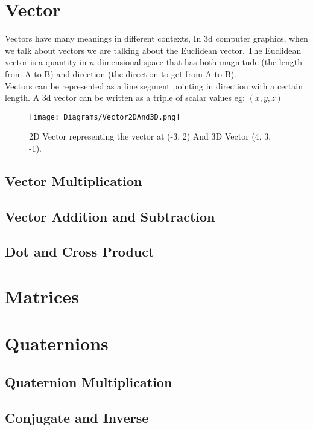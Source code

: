 \section{Vector}

Vectors have many meanings in different contexts, In \acrshort{3d} computer graphics, when we talk about vectors we are talking about the Euclidean vector. The Euclidean vector is a quantity in $n$-dimensional space that has both magnitude (the length from A to B) and direction (the direction to get from A to B). \\
Vectors can be represented as a line segment pointing in direction with a certain length. A \acrshort{3d} vector can be written as a triple of scalar values eg: $(x, y, z)$

\begin{figure}[htbp]
	{\centering
		\vspace{7px}
		\texttt{[image: Diagrams/Vector2DAnd3D.png]}
		\caption{2D Vector representing the vector at (-3, 2) And 3D Vector (4, 3, -1).}
		\label{3DAxisFigure}
	}
\end{figure}
\FloatBarrier

\subsection{Vector Multiplication}

\subsection{Vector Addition and Subtraction}

\subsection{Dot and Cross Product}

\section{Matrices}

\section{Quaternions}

\subsection{Quaternion Multiplication}

\subsection{Conjugate and Inverse}